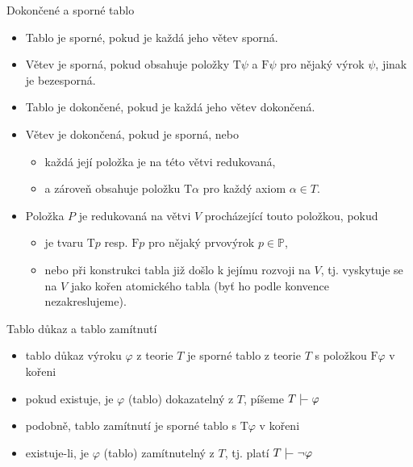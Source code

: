 \documentclass{beamer}
\begin{document}
\begin{frame}{Dokončené a sporné tablo}

    \begin{itemize}
        \item Tablo je \alert{sporné}, pokud je každá jeho větev sporná.
        \item Větev je \alert{sporná}, pokud obsahuje položky $\mathrm{T}\psi$ a $\mathrm{F}\psi$ pro nějaký výrok $\psi$, jinak je \alert{bezesporná}.
        \item Tablo je \alert{dokončené}, pokud je každá jeho větev dokončená.
        \item Větev je \alert{dokončená}, pokud je sporná, nebo
        \begin{itemize}
            \item každá její položka je na této větvi \alert{redukovaná},
            \item a zároveň obsahuje položku $\mathrm{T}\alpha$ pro každý axiom $\alpha\in T$.
        \end{itemize}
         
        \item Položka $P$ je \alert{redukovaná} na větvi $V$ procházející touto položkou, pokud 
        \begin{itemize}
            \item je tvaru $\mathrm{T}p$ resp. $\mathrm{F}p$ pro nějaký prvovýrok $p\in\mathbb P$, 
            \item nebo při konstrukci tabla již došlo k jejímu rozvoji na $V$, tj. vyskytuje se na $V$ jako kořen atomického tabla (byť ho podle konvence nezakreslujeme).
        \end{itemize}
    \end{itemize}

\end{frame}


\begin{frame}{Tablo důkaz a tablo zamítnutí}

    \begin{itemize}
        \item \alert{tablo důkaz} výroku $\varphi$ z teorie $T$ je \alert{sporné} tablo z teorie $T$ s položkou $\mathrm{F}\varphi$ v kořeni
        \item pokud existuje, je $\varphi$ \alert{(tablo) dokazatelný} z $T$, píšeme \alert{$T\proves\varphi$}
        \item podobně, \alert{tablo zamítnutí} je sporné tablo s $\mathrm{T}\varphi$ v kořeni
        \item existuje-li, je $\varphi$ \alert{(tablo) zamítnutelný} z $T$, tj. platí \alert{$T\proves\neg\varphi$}
    \end{itemize}

\end{frame}
\end{document}
